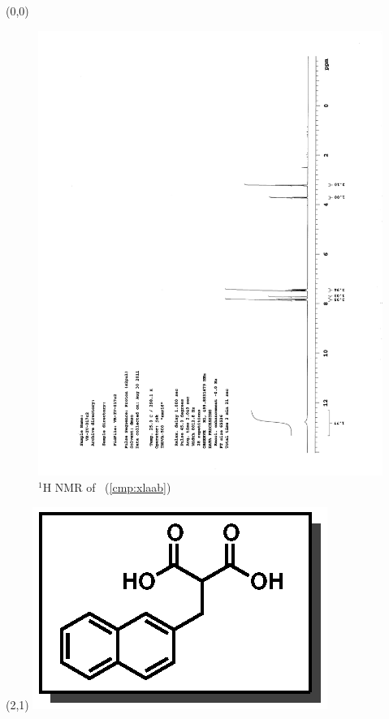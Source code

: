 \begin{textblock}{20}(0,0)
\begin{figure}[htb]
\caption{$^1$H NMR of \CMPxlaab\ (\ref{cmp:xlaab})}
\includegraphics[scale=0.75, trim = 0mm 0mm 0mm 5mm,
clip]{chp_asymmetric/images/nmr/xlaabH}
\vspace{-100pt}
\end{figure}
\end{textblock}
\begin{textblock}{1}(2,1)
\includegraphics[scale=0.8, angle=90]{chp_asymmetric/images/xlaab}
\end{textblock}

